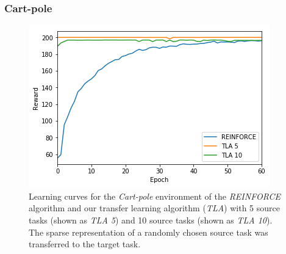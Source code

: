 \subsubsection{Cart-pole} %
\label{ssub:with_sparse_representation_transfer:cartpole}
\begin{figure}[htb]
    \centering
    \includegraphics[width=.8\linewidth]{images/results/CartPole/sparse_transfer/reward_target_re-akt5-akt10.png}
    \caption[Learning curves for the \textit{Cart-pole} environment of \textit{REINFORCE} and \textit{TLA} using sparse representation transfer]{Learning curves for the \emph{Cart-pole} environment of the \textit{REINFORCE} algorithm and our transfer learning algorithm (\textit{TLA}) with 5 source tasks (shown as \textit{TLA 5}) and 10 source tasks (shown as \textit{TLA 10}). The sparse representation of a randomly chosen source task was transferred to the target task.}
    \label{fig:CartPole:st:reward_target_re-akt5-akt10}
\end{figure}
